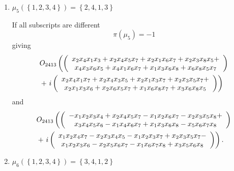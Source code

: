 \documentclass[aps,preprint]{revtex4}%
\begin{document}
\begin{enumerate}
\item $\mu_{5}\left(  \left\{  1,2,3,4\right\}  \right)  =\left\{
2,4,1,3\right\}  $

If all subscripts are different
\begin{equation}
\pi\left(  \mu_{5}\right)  =-1
\end{equation}
giving%
\begin{align*}
&  O_{2413}\left(  \left(
\begin{array}
[c]{c}%
\overset{}{x_{2}x_{4}x_{1}x_{3}+x_{2}x_{4}x_{5}x_{7}+x_{2}x_{1}x_{6}%
x_{7}+x_{2}x_{3}x_{8}x_{5}}+\\
x_{4}x_{3}x_{6}x_{5}+x_{4}x_{1}x_{6}x_{7}+x_{1}x_{3}x_{6}x_{8}+x_{6}x_{8}%
x_{5}x_{7}%
\end{array}
\right)  \right. \\
&  +\left.  i\left(
\begin{array}
[c]{c}%
\overset{}{x_{2}x_{4}x_{1}x_{7}+x_{2}x_{4}x_{3}x_{5}+x_{2}x_{1}x_{3}%
x_{7}+x_{2}x_{3}x_{5}x_{7}}+\\
x_{2}x_{1}x_{3}x_{6}+x_{2}x_{6}x_{5}x_{7}+x_{1}x_{6}x_{8}x_{7}+x_{3}x_{6}%
x_{8}x_{5}%
\end{array}
\right)  \right)
\end{align*}
and
\begin{align*}
&  O_{2413}\left(  \left(
\begin{array}
[c]{c}%
\overset{}{-x_{1}x_{2}x_{3}x_{4}+x_{2}x_{4}x_{5}x_{7}-x_{1}x_{2}x_{6}%
x_{7}-x_{2}x_{3}x_{5}x_{8}}+\\
x_{3}x_{4}x_{5}x_{6}-x_{1}x_{4}x_{6}x_{7}+x_{1}x_{3}x_{6}x_{8}-x_{5}x_{6}%
x_{7}x_{8}%
\end{array}
\right)  \right. \\
&  +\left.  i\left(
\begin{array}
[c]{c}%
x_{1}\overset{}{x_{2}x_{4}x_{7}-x_{2}x_{3}x_{4}x_{5}-x_{1}x_{2}x_{3}%
x_{7}+x_{2}x_{3}x_{5}x_{7}}-\\
x_{1}x_{2}x_{3}x_{6}-x_{2}x_{5}x_{6}x_{7}-x_{1}x_{6}x_{7}x_{8}+x_{3}x_{5}%
x_{6}x_{8}%
\end{array}
\right)  \right)  .
\end{align*}


\item $\mu_{6}\left(  \left\{  1,2,3,4\right\}  \right)  =\left\{
3,4,1,2\right\}  $


\end{enumerate}
\end{document}
